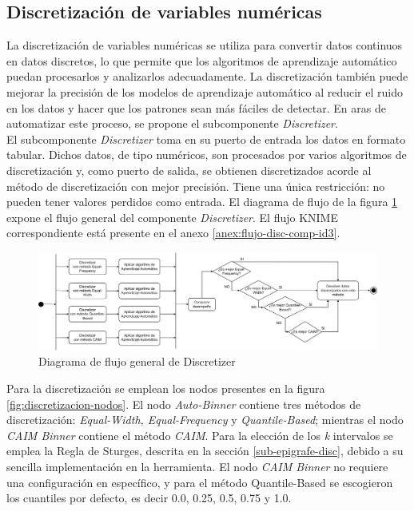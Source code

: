 \subsection{Discretización de variables numéricas} 
La discretización de variables numéricas se utiliza para convertir datos continuos en datos discretos, lo que permite que los algoritmos de aprendizaje automático puedan procesarlos y analizarlos adecuadamente. La discretización también puede mejorar la precisión de los modelos de aprendizaje automático al reducir el ruido en los datos y hacer que los patrones sean más fáciles de detectar. En aras de automatizar este proceso, se propone el subcomponente \textit{Discretizer}. \\
El subcomponente \textit{Discretizer} toma en su puerto de entrada los datos en formato tabular. Dichos datos, de tipo numéricos, son procesados por varios algoritmos de discretización y, como puerto de salida, se obtienen discretizados acorde al método de discretización con mejor precisión. Tiene una única restricción: no pueden tener valores perdidos como entrada. El diagrama de flujo de la figura \ref{fig:discretizacion} expone el flujo general del componente \textit{Discretizer}. El flujo KNIME correspondiente está presente en el anexo \ref{anex:flujo-disc-comp-id3}.

\begin{figure}[H]
	\centering
	\includegraphics[width=1\linewidth]{"figuras/capi 2/preprocesado/discretizacion.drawio"}
	\caption{Diagrama de flujo general de Discretizer}
	\label{fig:discretizacion}
\end{figure}

Para la discretización se emplean los nodos presentes en la figura \ref{fig:discretizacion-nodos}. El nodo \textit{Auto-Binner} contiene tres métodos de discretización: \textit{Equal-Width, Equal-Frequency} y \textit{Quantile-Based}; mientras el nodo \textit{CAIM Binner} contiene el método \textit{CAIM}. Para la elección de los \textit{k} intervalos se emplea la Regla de Sturges, descrita en la sección \ref{sub-epigrafe-disc}, debido a su sencilla implementación en la herramienta. El nodo \textit{CAIM Binner} no requiere una configuración en específico, y para el método Quantile-Based se escogieron los cuantiles por defecto, es decir 0.0, 0.25, 0.5, 0.75 y 1.0.

